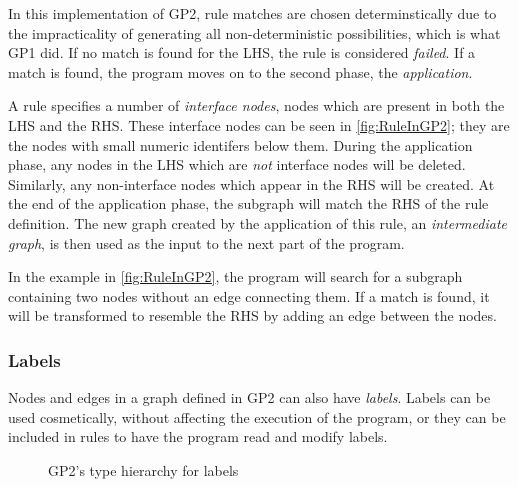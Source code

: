 \documentclass[authoryearcitations]{UoYCSproject}
\newenvironment{nscenter}
    {\parskip=0pt\par\nopagebreak\centering}
    {\par\noindent\ignorespacesafterend}
\begin{document}
In this implementation of GP2, rule matches are chosen determinstically due to the
impracticality of generating all non-deterministic possibilities, which is what GP1 did.
If no match is found for the LHS, the rule is considered \emph{failed}. If a match is
found, the program moves on to the second phase, the \emph{application}.

A rule specifies a number of \emph{interface nodes}, nodes which are present in both
the LHS and the RHS. These interface nodes can be seen in \autoref{fig:RuleInGP2}; they
are the nodes with small numeric identifers below them. During the application phase,
any nodes in the LHS which are \emph{not} interface nodes will be deleted. Similarly,
any non-interface nodes which appear in the RHS will be created. At the end of the
application phase, the subgraph will match the RHS of the rule definition. The new
graph created by the application of this rule, an \emph{intermediate graph}, is then
used as the input to the next part of the program.

In the example in \autoref{fig:RuleInGP2}, the program will search for a subgraph
containing two nodes without an edge connecting them. If a match is found, it will
be transformed to resemble the RHS by adding an edge between the nodes.


\subsubsection{Labels}
\label{sec:Labels}

Nodes and edges in a graph defined in GP2 can also have \emph{labels}. Labels
can be used cosmetically, without affecting the execution of the program, or
they can be included in rules to have the program read and modify labels.

\begin{figure}
    \begin{framed}
    \begin{nscenter}
    \end{nscenter}
    \end{framed}
    \caption{GP2's type hierarchy for labels}
    \label{fig:TypeHierarchy}
\end{figure}
\end{document}
